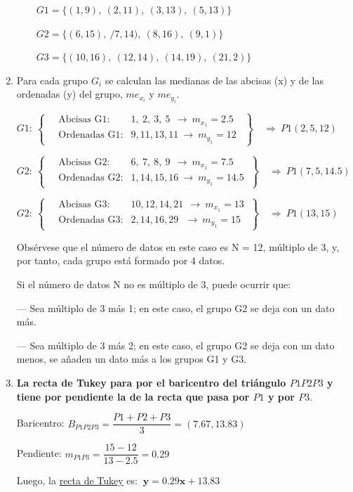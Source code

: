 \begin{example}
\begin{enumerate}
$\qquad G1=\{(1,9),\ (2,11),\ (3,13),\ (5,13) \}$

$\qquad G2=\{(6,15),\ /7,14),\ (8,16),\ (9,1) \}$

$\qquad G3=\{(10,16),\ (12,14),\ (14,19),\ (21,2) \}$



\item Para cada grupo $G_i$ se calculan las medianas de las abcisas (x) y de las ordenadas (y) del grupo, $me_{x_i}$ y $me_{y_i}$.


$G1: \ \left.
\begin{cases}
\quad \text{Abcisas   G1:} & 1,\ 2,\ 3,\ 5 \ \ \to \ m_{x_1}=2.5	 \ 
\\
\quad \text{Ordenadas G1:} & 9, 11, 13, 11 \ \to \ m_{y_1}=12	\ 
\end{cases} \ \right\}  \quad  \Rightarrow \ P1(2,5,12) $

$G2: \ \left.
\begin{cases}
\quad \text{Abcisas   G2:} & 6,\ 7,\ 8,\ 9 \ \ \to \ m_{x_1}=7.5	
\\
\quad \text{Ordenadas G2:} & 1, 14, 15, 16 \ \to \ m_{y_1}=14.5	
\end{cases} \ \right\}  \quad  \Rightarrow \ P1(7,5,14.5) $

$G2: \ \left.
\begin{cases}
\quad \text{Abcisas   G3:} & 10, 12, 14, 21 \ \ \to \ m_{x_1}=13 	
\\
\quad \text{Ordenadas G3:} & 2, 14, 16, 29 \ \ \ \to \ m_{y_1}=15	
\end{cases} \ \right\}  \quad  \Rightarrow \  P1(13,15) $

\vspace{2mm} Obsérvese que el número de datos en este caso es N = 12, múltiplo de 3, y, por tanto, cada grupo está formado por 4 datos. 

\vspace{2mm} Si el número de datos N no es múltiplo de 3, puede ocurrir que:

--- Sea múltiplo de 3 más 1; en este caso, el grupo G2 se deja con un dato más.

--- Sea múltiplo de 3 más 2; en este caso, el grupo G2 se deja con un dato menos, se añaden un dato más a los grupos G1 y G3.

\item \textbf{La recta de Tukey para por el baricentro del triángulo $P1P2P3$ y tiene por pendiente la de la recta que pasa por $P1$ y por $P3$}.

\vspace{2mm}  Baricentro: $B_{P1P2P3}=\dfrac{P1+P2+P3}{3}=(7.67,13.83)$

\vspace{2mm}  Pendiente: $m_{P1P3}=\dfrac{15-12}{13-2.5}=0.29$

\vspace{2mm}  Luego, la \underline{recta de Tukey} es: $\ \boldsymbol{y=0.29x+13.83}$

\end{enumerate}
\end{example}




